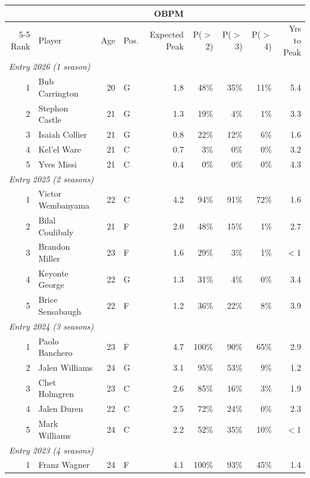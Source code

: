\begin{table}[htbp]
  \centering\small
  \begin{tabular}{rlrlrrrrr}
    \toprule
     & & & & OBPM & & & & \\
    \cmidrule(lr){5-5}
    Rank & Player & Age & Pos. & Expected Peak & P($>$2) & P($>$3) & P($>$4) & Yrs to Peak \\
    \midrule
    \multicolumn{9}{l}{\textit{Entry 2026 (1 season)}} \\
    \midrule
    1 & Bub Carrington & 20 & G & 1.8 & 48\% & 35\% & 11\% & 5.4 \\
    2 & Stephon Castle & 21 & G & 1.3 & 19\% & 4\% & 1\% & 3.3 \\
    3 & Isaiah Collier & 21 & G & 0.8 & 22\% & 12\% & 6\% & 1.6 \\
    4 & Kel'el Ware & 21 & C & 0.7 & 3\% & 0\% & 0\% & 3.2 \\
    5 & Yves Missi & 21 & C & 0.4 & 0\% & 0\% & 0\% & 4.3 \\
    \midrule[0.4pt]
    \multicolumn{9}{l}{\textit{Entry 2025 (2 seasons)}} \\
    \midrule
    1 & Victor Wembanyama & 22 & C & 4.2 & 94\% & 91\% & 72\% & 1.6 \\
    2 & Bilal Coulibaly & 21 & F & 2.0 & 48\% & 15\% & 1\% & 2.7 \\
    3 & Brandon Miller & 23 & F & 1.6 & 29\% & 3\% & 1\% & $<$1 \\
    4 & Keyonte George & 22 & G & 1.3 & 31\% & 4\% & 0\% & 3.4 \\
    5 & Brice Sensabaugh & 22 & F & 1.2 & 36\% & 22\% & 8\% & 3.9 \\
    \midrule[0.4pt]
    \multicolumn{9}{l}{\textit{Entry 2024 (3 seasons)}} \\
    \midrule
    1 & Paolo Banchero & 23 & F & 4.7 & 100\% & 90\% & 65\% & 2.9 \\
    2 & Jalen Williams & 24 & G & 3.1 & 95\% & 53\% & 9\% & 1.2 \\
    3 & Chet Holmgren & 23 & C & 2.6 & 85\% & 16\% & 3\% & 1.9 \\
    4 & Jalen Duren & 22 & C & 2.5 & 72\% & 24\% & 0\% & 2.3 \\
    5 & Mark Williams & 24 & C & 2.2 & 52\% & 35\% & 10\% & $<$1 \\
    \midrule[0.4pt]
    \multicolumn{9}{l}{\textit{Entry 2023 (4 seasons)}} \\
    \midrule
    1 & Franz Wagner & 24 & F & 4.1 & 100\% & 93\% & 45\% & 1.4 \\

\end{tabular}
\end{table}

